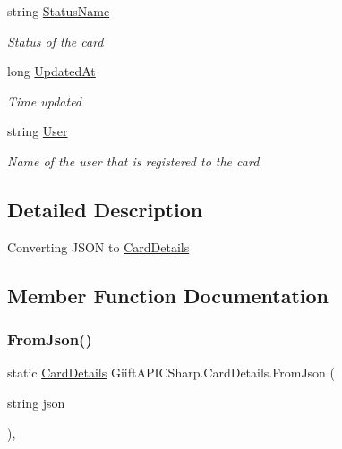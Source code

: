\begin{DoxyCompactItemize}
string \hyperlink{class_giift_a_p_i_c_sharp_1_1_card_details_a4296f6659c146014b79acc00f551c6af}{Status\+Name}
\begin{DoxyCompactList}\small\item\em Status of the card \end{DoxyCompactList}\item 
long \hyperlink{class_giift_a_p_i_c_sharp_1_1_card_details_aa23b5e4aea5193020231377f2b9f47db}{Updated\+At}
\begin{DoxyCompactList}\small\item\em Time updated \end{DoxyCompactList}\item 
string \hyperlink{class_giift_a_p_i_c_sharp_1_1_card_details_afc8c9fb2688cf773a6731b28b8878de7}{User}
\begin{DoxyCompactList}\small\item\em Name of the user that is registered to the card \end{DoxyCompactList}\end{DoxyCompactItemize}


\subsection{Detailed Description}
Converting J\+S\+ON to \hyperlink{class_giift_a_p_i_c_sharp_1_1_card_details}{Card\+Details} 



\subsection{Member Function Documentation}
\mbox{\label{class_giift_a_p_i_c_sharp_1_1_card_details_a5660bd7c1e94ef1c631189c31232f640}} 
\subsubsection{\texorpdfstring{From\+Json()}{FromJson()}}
{\footnotesize\ttfamily static \hyperlink{class_giift_a_p_i_c_sharp_1_1_card_details}{Card\+Details} Giift\+A\+P\+I\+C\+Sharp.\+Card\+Details.\+From\+Json (\begin{DoxyParamCaption}\item[{string}]{json }\end{DoxyParamCaption})\hspace{0.3cm}{\ttfamily [inline]}, {\ttfamily [static]}}



